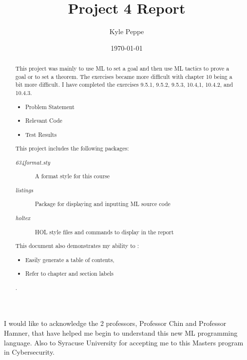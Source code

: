 \documentclass{report}
\title{Project 4 Report}
\author{Kyle Peppe}
\date{\today}
\begin{document}
\lstset{language=ML}


\maketitle{}

\begin{abstract}
  This project was mainly to use ML to set a goal and then use ML
  tactics to prove a goal or to set a theorem. The exercises became
  more difficult with chapter 10 being a bit more difficult. I have
  completed the exercises 9.5.1, 9.5.2, 9.5.3, 10.4,1, 10.4.2, and
  10.4.3.
	\begin{itemize}
		\item Problem Statement
		\item Relevant Code
		\item Test Results
	\end{itemize}
        This project includes the following packages:
	\begin{description}
		\item[\emph{634format.sty}] A format style for this course
		\item[\emph{listings}] Package for displaying and inputting ML source code
		\item[\emph{holtex}] HOL style files and commands to display in the report
	\end{description}
        This document also demonstrates my ability to :
	\begin{itemize}
		\item Easily generate a table of contents,
		\item Refer to chapter and section labels
	\end{itemize}.
\end{abstract}

\tableofcontents{}

\begin{acknowledgments}
  I would like to acknowledge the 2 professors, Professor Chin and 
  Professor Hamner, that have helped me begin to understand this new
  ML programming language. Also to Syracuse University for accepting
  me to this Masters program in Cybersecurity.
\end{acknowledgments}
\end{document}
